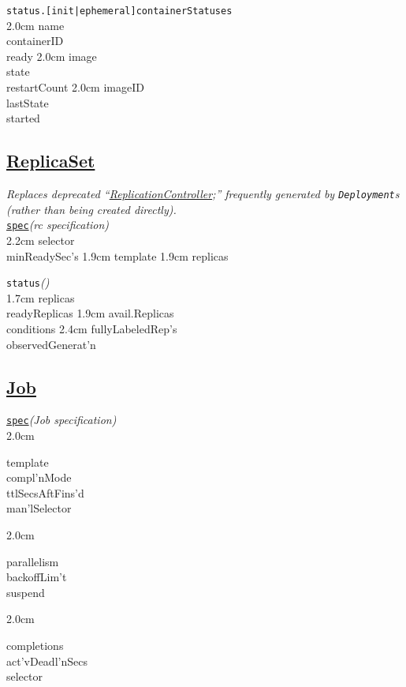 \texttt{status.[init|ephemeral]containerStatuses}\\[-2mm]
\api
{2.0cm}{
name            \\
containerID     \\
ready           
}
{2.0cm}{
image           \\
state           \\
restartCount    
}
{2.0cm}{
imageID         \\
lastState       \\
started         
}
\stopapi


\subsection*{\href{https://kubernetes.io/docs/concepts/workloads/controllers/replicaset/}{ReplicaSet}}
\textit{Replaces deprecated ``\href{https://kubernetes.io/docs/reference/kubernetes-api/workload-resources/replication-controller-v1/}{ReplicationController};'' frequently generated by {\tt Deployment}s (rather than being created directly).}\\
\texttt{\href{https://kubernetes.io/docs/reference/kubernetes-api/workload-resources/replica-set-v1/}{spec}}\quad\textit{(rc specification)}\\[-2mm]
\api
{2.2cm}{
selector    \\
minReadySec's   
}
{1.9cm}{
template
}
{1.9cm}{
replicas
}
\stopapi


\texttt{status}\quad\textit{()}\\[-2mm]
\api
{1.7cm}{
replicas        \\
readyReplicas   
}
{1.9cm}{
avail.Replicas  \\
conditions      
}
{2.4cm}{
fullyLabeledRep's    \\
observedGenerat'n
}
\stopapi


\subsection*{\href{https://kubernetes.io/docs/concepts/workloads/controllers/job/}{Job}}


\texttt{\href{https://kubernetes.io/docs/reference/kubernetes-api/workload-resources/job-v1/}{spec}}\quad\textit{(Job specification)}\\[-2mm]
\api
{2.0cm}{
template        \\
compl'nMode     \\
ttlSecsAftFins'd\\
man'lSelector   

}
{2.0cm}{
parallelism     \\
backoffLim't    \\
suspend         

}
{2.0cm}{
completions     \\
act'vDeadl'nSecs\\
selector        

}
\stopapi


